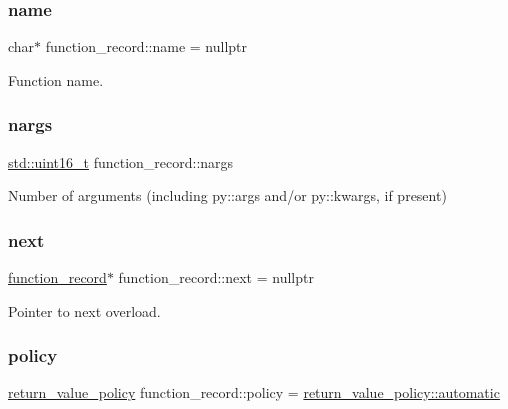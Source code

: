 \mbox{\label{structfunction__record_a55d760eb0046c3beec8a20d94ed1d07c}} 
\subsubsection{\texorpdfstring{name}{name}}
{\footnotesize\ttfamily char$\ast$ function\+\_\+record\+::name = nullptr}



Function name. 

\mbox{\label{structfunction__record_a8082876641e039386647a6b6b5118d41}} 
\subsubsection{\texorpdfstring{nargs}{nargs}}
{\footnotesize\ttfamily \mbox{\hyperlink{_s_d_l__config_8h_a273cf69d639a59973b6019625df33e30}{std\+::uint16\+\_\+t}} function\+\_\+record\+::nargs}



Number of arguments (including py\+::args and/or py\+::kwargs, if present) 

\mbox{\label{structfunction__record_a141b30999d54286b04d06ad6180dbf99}} 
\subsubsection{\texorpdfstring{next}{next}}
{\footnotesize\ttfamily \mbox{\hyperlink{structfunction__record}{function\+\_\+record}}$\ast$ function\+\_\+record\+::next = nullptr}



Pointer to next overload. 

\mbox{\label{structfunction__record_a27926b7355bd89048ff5da97758b5282}} 
\subsubsection{\texorpdfstring{policy}{policy}}
{\footnotesize\ttfamily \mbox{\hyperlink{detail_2common_8h_adde72ab1fb0dd4b48a5232c349a53841}{return\+\_\+value\+\_\+policy}} function\+\_\+record\+::policy = \mbox{\hyperlink{detail_2common_8h_adde72ab1fb0dd4b48a5232c349a53841a2bd9c0ed00116be1258e0cc66617d7c8}{return\+\_\+value\+\_\+policy\+::automatic}}}




